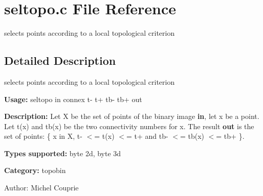 \section{seltopo.c File Reference}
\label{seltopo_8c}
selects points according to a local topological criterion 



\subsection{Detailed Description}
selects points according to a local topological criterion 

{\bf Usage:} seltopo in connex t- t+ tb- tb+ out

{\bf Description:} Let X be the set of points of the binary image {\bf in}, let x be a point. Let t(x) and tb(x) be the two connectivity numbers for x. The result {\bf out} is the set of points: \{ x in X, t- $<$= t(x) $<$= t+ and tb- $<$= tb(x) $<$= tb+ \}.

{\bf Types supported:} byte 2d, byte 3d

{\bf Category:} topobin

\begin{Desc}
\item[Author:]Michel Couprie \end{Desc}
